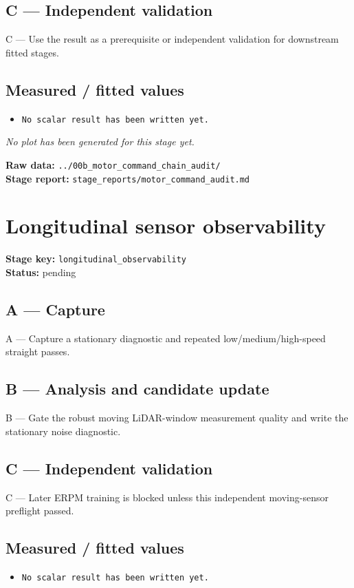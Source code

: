\documentclass[11pt,a4paper]{article}
\begin{document}
\subsection*{C --- Independent validation}
C — Use the result as a prerequisite or independent validation for downstream fitted stages.

\subsection*{Measured / fitted values}
\begin{itemize}\setlength\itemsep{0pt}
\item \texttt{No scalar result has been written yet.}
\end{itemize}

\textit{No plot has been generated for this stage yet.}

\vfill
\textbf{Raw data:} \texttt{../00b\_motor\_command\_chain\_audit/}\\
\textbf{Stage report:} \texttt{stage\_reports/motor\_command\_audit.md}
\clearpage
\small
\section*{Longitudinal sensor observability}
\textbf{Stage key:} \texttt{longitudinal\_observability}\\
\textbf{Status:} pending\\

\subsection*{A --- Capture}
A — Capture a stationary diagnostic and repeated low/medium/high-speed straight passes.

\subsection*{B --- Analysis and candidate update}
B — Gate the robust moving LiDAR-window measurement quality and write the stationary noise diagnostic.

\subsection*{C --- Independent validation}
C — Later ERPM training is blocked unless this independent moving-sensor preflight passed.

\subsection*{Measured / fitted values}
\begin{itemize}\setlength\itemsep{0pt}
\item \texttt{No scalar result has been written yet.}
\end{itemize}
\end{document}
